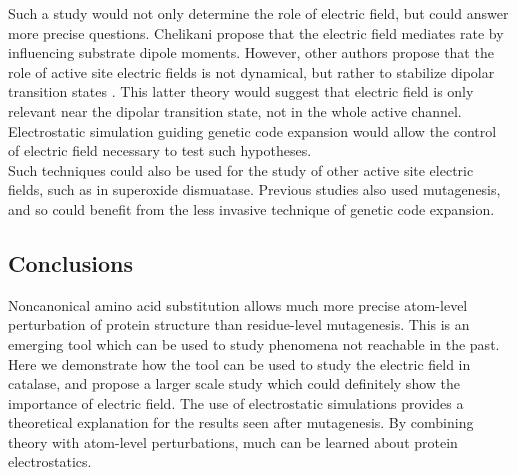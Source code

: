 \documentclass[9pt,twocolumn,twoside]{pnas-new}
\begin{document}
Such a study would not only determine the role of electric field, but could answer more precise questions. Chelikani propose that the electric field mediates rate by influencing substrate dipole moments. However, other authors propose that the role of active site electric fields is not dynamical, but rather to stabilize dipolar transition states \cite{asdipolestabilization}. This latter theory would suggest that electric field is only relevant near the dipolar transition state, not in the whole active channel. Electrostatic simulation guiding genetic code expansion would allow the control of electric field necessary to test such hypotheses.\\

Such techniques could also be used for the study of other active site electric fields, such as in superoxide dismuatase. Previous studies \cite{concentrated-as-efield-sod} also used mutagenesis, and so could benefit from the less invasive technique of genetic code expansion.\\

\subsection*{Conclusions}
Noncanonical amino acid substitution allows much more precise atom-level perturbation of protein structure than residue-level mutagenesis. This is an emerging tool which can be used to study phenomena not reachable in the past. Here we demonstrate how the tool can be used to study the electric field in catalase, and propose a larger scale study which could definitely show the importance of electric field. The use of electrostatic simulations provides a theoretical explanation for the results seen after mutagenesis. By combining theory with atom-level perturbations, much can be learned about protein electrostatics.
\end{document}
